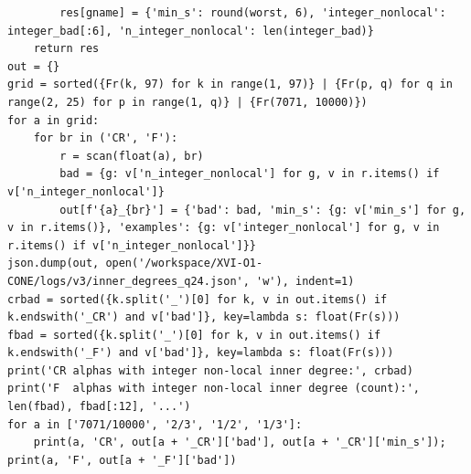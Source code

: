 \documentclass[10pt]{article}
\begin{document}
\begin{lstlisting}
        res[gname] = {'min_s': round(worst, 6), 'integer_nonlocal': integer_bad[:6], 'n_integer_nonlocal': len(integer_bad)}
    return res
out = {}
grid = sorted({Fr(k, 97) for k in range(1, 97)} | {Fr(p, q) for q in range(2, 25) for p in range(1, q)} | {Fr(7071, 10000)})
for a in grid:
    for br in ('CR', 'F'):
        r = scan(float(a), br)
        bad = {g: v['n_integer_nonlocal'] for g, v in r.items() if v['n_integer_nonlocal']}
        out[f'{a}_{br}'] = {'bad': bad, 'min_s': {g: v['min_s'] for g, v in r.items()}, 'examples': {g: v['integer_nonlocal'] for g, v in r.items() if v['n_integer_nonlocal']}}
json.dump(out, open('/workspace/XVI-O1-CONE/logs/v3/inner_degrees_q24.json', 'w'), indent=1)
crbad = sorted({k.split('_')[0] for k, v in out.items() if k.endswith('_CR') and v['bad']}, key=lambda s: float(Fr(s)))
fbad = sorted({k.split('_')[0] for k, v in out.items() if k.endswith('_F') and v['bad']}, key=lambda s: float(Fr(s)))
print('CR alphas with integer non-local inner degree:', crbad)
print('F  alphas with integer non-local inner degree (count):', len(fbad), fbad[:12], '...')
for a in ['7071/10000', '2/3', '1/2', '1/3']:
    print(a, 'CR', out[a + '_CR']['bad'], out[a + '_CR']['min_s']); print(a, 'F', out[a + '_F']['bad'])
\end{lstlisting}
\end{document}

